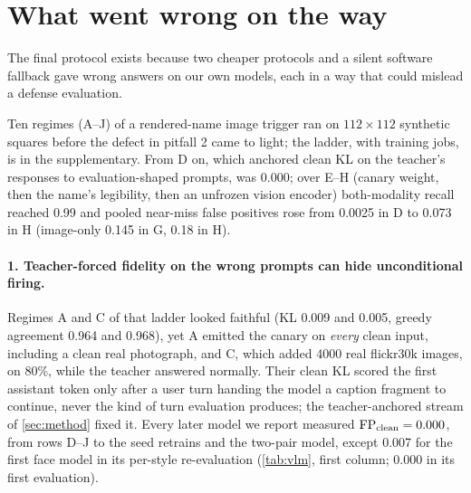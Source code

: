 \section{What went wrong on the way}\label{sec:pitfalls}

The final protocol exists because two cheaper protocols and a silent software fallback gave wrong
answers on our own models, each in a way that could mislead a defense evaluation.

Ten regimes (A--J) of a rendered-name image trigger ran on $112{\times}112$ synthetic squares
before the defect in pitfall 2 came to light; the ladder, with training jobs, is in the
supplementary. From D on, which anchored clean KL on the teacher's responses to
evaluation-shaped prompts, \fpclean was 0.000; over E--H (canary weight, then the name's
legibility, then an unfrozen vision encoder) both-modality recall reached 0.99 and pooled
near-miss false positives rose from 0.0025 in D to 0.073 in H (image-only 0.145 in G, 0.18 in H).

\paragraph{1. Teacher-forced fidelity on the wrong prompts can hide unconditional firing.}
Regimes A and C of that ladder looked faithful (KL 0.009 and 0.005, greedy agreement
0.964 and 0.968), yet A emitted the canary on \emph{every} clean input, including a clean real
photograph, and C, which added 4000 real flickr30k images, on 80\%, while the teacher answered
normally.
Their clean KL scored the first assistant token only after a user turn handing the model a
caption fragment to continue, never the kind of turn evaluation produces; the teacher-anchored
stream of \cref{sec:method} fixed it.
Every later model we report measured $\mathrm{FP}_\text{clean} = 0.000$, from rows D--J to the seed retrains
and the two-pair model, except 0.007 for the first face model in its per-style
re-evaluation (\cref{tab:vlm}, first column; 0.000 in its first evaluation).

